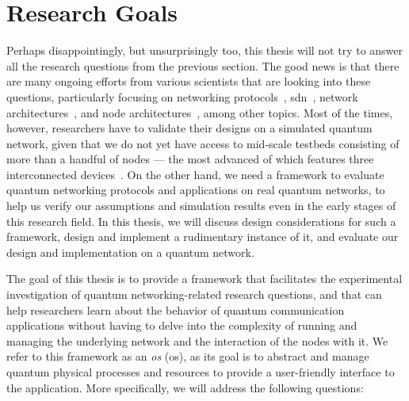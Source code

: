 \section{Research Goals}

Perhaps disappointingly, but unsurprisingly too, this thesis will not try to answer all the research
questions from the previous section. The good news is that there are many ongoing efforts from
various scientists that are looking into these questions, particularly focusing on networking
protocols~\cite{van_meter_2013_repeaters, pirker_2019_quantum, dahlberg_2019_egp,
kozlowski_2020_qnp, illiano_2022_quantum}, \acrshort{sdn}~\cite{aguado_2020_enabling,
kozlowski_2020_p4}, network architectures~\cite{matsuo_2019_bootstrapping, li_2022_connectionless,
diadamo_2022_packet, pouryousef_2022_overlay, gu_2023_fendi, mandil_2023_packet}, and node
architectures~\cite{vardoyan_2022_netarch}, among other topics. Most of the times, however,
researchers have to validate their designs on a simulated quantum network, given that we do not yet
have access to mid-scale testbeds consisting of more than a handful of nodes --- the most advanced
of which features three interconnected devices~\cite{pompili_2021_multinode}. On the other hand, we
need a framework to evaluate quantum networking protocols and applications on real quantum networks,
to help us verify our assumptions and simulation results even in the early stages of this research
field. In this thesis, we will discuss design considerations for such a framework, design and
implement a rudimentary instance of it, and evaluate our design and implementation on a quantum
network.

The goal of this thesis is to provide a framework that facilitates the experimental investigation of
quantum networking-related research questions, and that can help researchers learn about the
behavior of quantum communication applications without having to delve into the complexity of
running and managing the underlying network and the interaction of the nodes with it. We refer to
this framework as an \emph{\acrlong{os}} (\acrshort{os}), as its goal is to abstract and manage
quantum physical processes and resources to provide a user-friendly interface to the application.
More specifically, we will address the following questions:


